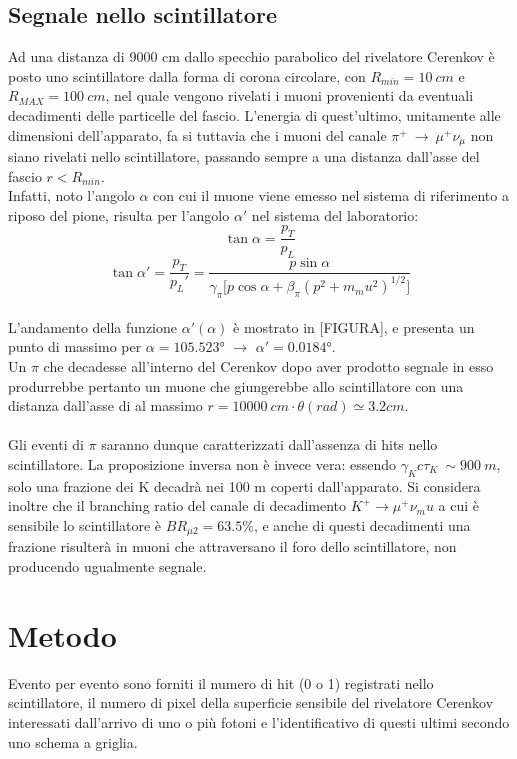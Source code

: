 \documentclass[8pt]{extarticle}
\begin{document}
\subsection{Segnale nello scintillatore}
Ad una distanza di 9000 cm dallo specchio parabolico del rivelatore Cerenkov è posto uno scintillatore dalla forma di corona circolare, con $R_{min}=10\ cm$ e $R_{MAX}=100\ cm$, nel quale vengono rivelati i muoni provenienti da eventuali decadimenti delle particelle del fascio.
L'energia di quest'ultimo, unitamente alle dimensioni dell'apparato, fa si tuttavia che i muoni del canale $\pi^+ \ \rightarrow \ \mu^+ \nu_\mu$ non siano rivelati nello scintillatore, passando sempre a una distanza dall'asse del fascio $r<R_{min}$. \\
Infatti, noto l'angolo $\alpha$ con cui il muone viene emesso nel sistema di riferimento a riposo del pione, risulta per l'angolo $\alpha'$ nel sistema del laboratorio:
\begin{equation}
\tan{\alpha}=\frac{p_T}{p_L}
\end{equation}
\begin{equation}
\tan{\alpha'}=\frac{p_T}{p_L'}=\frac{p\sin{\alpha}}{\gamma_{\pi}\big[p\cos{\alpha}+\beta_{\pi} (p^2+m_mu^2)^{1/2}\big]}
\end{equation}
\\
L'andamento della funzione $\alpha'(\alpha)$ è mostrato in [FIGURA], e presenta un punto  di massimo per $	\alpha=105.523°$ $\rightarrow$ $\alpha'=0.0184°$.\\
Un $\pi$ che decadesse all'interno del Cerenkov dopo aver prodotto segnale in esso produrrebbe pertanto un muone che giungerebbe allo scintillatore con una distanza dall'asse di al massimo $r=10000\ cm \cdot \theta (rad) \simeq 3.2 cm$.\\
\\
Gli eventi di $\pi$ saranno dunque caratterizzati dall'assenza di hits nello scintillatore. La proposizione inversa non è invece vera: essendo $\gamma_K c \tau_K \ \sim 900 \ m$, solo una frazione dei K decadrà nei 100 m coperti dall'apparato. Si considera inoltre che il branching ratio del canale di decadimento $K^+ \rightarrow \mu^+\nu_mu$ a cui è sensibile lo scintillatore è $BR_{\mu 2}=63.5\%$, e anche di questi decadimenti una frazione risulterà in muoni che attraversano il foro dello scintillatore, non producendo ugualmente segnale.
\\
\section{Metodo}
Evento per evento sono forniti il numero di hit (0 o 1) registrati nello scintillatore, il numero di pixel della superficie sensibile del rivelatore Cerenkov interessati dall'arrivo di uno o più fotoni e l'identificativo di questi ultimi secondo uno schema a griglia.\\
\end{document}
